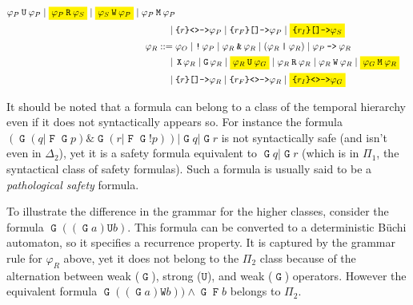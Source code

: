 \documentclass[a4paper,twoside,10pt,DIV=12]{scrreprt}
\DeclareMathOperator{\F}{\texttt{F}}
\DeclareMathOperator{\G}{\texttt{G}}
\newcommand{\U}{\mathbin{\texttt{U}}}
\newcommand{\R}{\mathbin{\texttt{R}}}
\DeclareMathOperator{\X}{\texttt{X}}
\newcommand{\M}{\mathbin{\texttt{M}}}
\newcommand{\W}{\mathbin{\texttt{W}}}
\DeclareMathOperator{\NOT}{\texttt{!}}
\newcommand{\IMPLIES}{\mathbin{\texttt{->}}}
\newcommand{\OR}{\mathbin{\texttt{|}}}
\newcommand{\AND}{\mathbin{\texttt{\&}}}
\newcommand{\0}{\texttt{0}}
\newcommand{\1}{\texttt{1}}
\newcommand{\Esuffix}{\texttt{<>->}}
\newcommand{\Asuffix}{\texttt{[]->}}
\newcommand{\sere}[1]{\texttt{\{}#1\texttt{\}}}
\begin{document}
\begin{align*}
                   \varphi_P\U\varphi_P\mid\colorbox{yellow}{$\varphi_P\R\varphi_S$}\mid
                   \colorbox{yellow}{$\varphi_S\W\varphi_P$}\mid\varphi_P\M\varphi_P\\
           \mid{}& \sere{r}\Esuffix \varphi_P\mid
                   \sere{r_F}\Asuffix \varphi_P\mid
                   \colorbox{yellow}{$\sere{r_I}\Asuffix \varphi_S$}\\
  \varphi_R ::={}& \varphi_O \mid \NOT\varphi_P\mid
                   \varphi_R\AND \varphi_R\mid (\varphi_R\OR \varphi_R)\mid
                   \varphi_P\IMPLIES \varphi_R\\
           \mid{}& \X\varphi_R \mid \G\varphi_R \mid
                   \colorbox{yellow}{$\varphi_R\U\varphi_G$}\mid\varphi_R\R\varphi_R\mid
                   \varphi_R\W\varphi_R\mid\colorbox{yellow}{$\varphi_G\M\varphi_R$}\\
           \mid{}& \sere{r}\Asuffix \varphi_R\mid \sere{r_F}\Esuffix \varphi_R \mid \colorbox{yellow}{$\sere{r_I}\Esuffix \varphi_G$}\\
\end{align*}


It should be noted that a formula can belong to a class of the
temporal hierarchy even if it does not syntactically appears so.  For
instance the formula
$(\G(q\OR \F\G p)\AND \G(r\OR \F\G\NOT p))\OR\G q\OR \G r$ is not
syntactically safe (and isn't even in $\Delta_2$), yet it is a safety
formula equivalent to $\G q\OR \G r$ (which is in $\Pi_1$, the
syntactical class of safety formulas).  Such a formula is usually said
to be a \emph{pathological safety} formula.

To illustrate the difference in the grammar for the higher classes,
consider the formula $\G((\G a) \U b)$.  This formula can be converted
to a deterministic Büchi automaton, so it specifies a recurrence
property.  It is captured by the grammar rule for $\varphi_R$ above,
yet it does not belong to the $\Pi_2$ class because of the alternation
between weak ($\G$), strong ($\U$), and weak ($\G$) operators.
However the equivalent formula $\G((\G a) \W b))\land \G\F b$ belongs
to $\Pi_2$.
\end{document}

